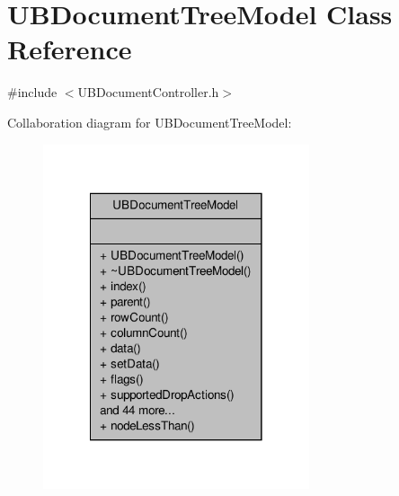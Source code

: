 \hypertarget{class_u_b_document_tree_model}{\section{U\-B\-Document\-Tree\-Model Class Reference}
\label{dd/d5a/class_u_b_document_tree_model}
}


{\ttfamily \#include $<$U\-B\-Document\-Controller.\-h$>$}



Collaboration diagram for U\-B\-Document\-Tree\-Model\-:
\nopagebreak
\begin{figure}[H]
\begin{center}
\leavevmode
\includegraphics[width=222pt]{d0/d24/class_u_b_document_tree_model__coll__graph}
\end{center}
\end{figure}

